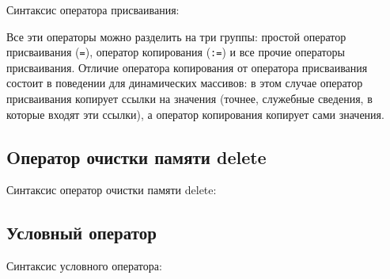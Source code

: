 \documentclass[10pt]{report}
\begin{document}
Синтаксис оператора присваивания:
\begin{center}
\textcolor{Green}{}
\end{center}

Все эти операторы можно разделить на три группы: простой оператор присваивания (\texttt{=}), оператор копирования (\texttt{:=}) и все прочие операторы присваивания.
Отличие оператора копирования от оператора присваивания состоит в поведении для динамических массивов: в этом случае оператор присваивания копирует
ссылки на значения (точнее, служебные сведения, в которые входят эти ссылки), а оператор копирования копирует сами значения. 


\subsection{Oператор очистки памяти delete}
Синтаксис оператор очистки памяти delete:
\begin{center}
\noindent\textcolor{Green}{}

\end{center}


    \subsection{Условный оператор}
Синтаксис условного оператора:
\end{document}
